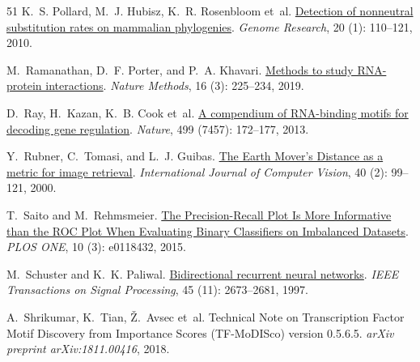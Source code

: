 \begin{thebibliography}{51}
K.~S. Pollard, M.~J. Hubisz, K.~R. Rosenbloom et~al.
\newblock \href{https://doi.org/10.1101/gr.097857.109}{Detection of nonneutral
  substitution rates on mammalian phylogenies}.
\newblock \emph{Genome Research}, 20 (1): 110--121, 2010.

M.~Ramanathan, D.~F. Porter, and P.~A. Khavari.
\newblock \href{https://doi.org/10.1038/s41592-019-0330-1}{Methods to study
  RNA-protein interactions}.
\newblock \emph{Nature Methods}, 16 (3): 225--234, 2019.

D.~Ray, H.~Kazan, K.~B. Cook et~al.
\newblock \href{https://doi.org/10.1038/nature12311}{A compendium of
  RNA-binding motifs for decoding gene regulation}.
\newblock \emph{Nature}, 499 (7457): 172--177, 2013.

Y.~Rubner, C.~Tomasi, and L.~J. Guibas.
\newblock \href{https://doi.org/10.1023/A:1026543900054}{The Earth Mover's
  Distance as a metric for image retrieval}.
\newblock \emph{International Journal of Computer Vision}, 40
  (2): 99--121, 2000.

T.~Saito and M.~Rehmsmeier.
\newblock \href{https://doi.org/10.1371/journal.pone.0118432}{The
  Precision-Recall Plot Is More Informative than the ROC Plot When Evaluating
  Binary Classifiers on Imbalanced Datasets}.
\newblock \emph{PLOS ONE}, 10 (3): e0118432, 2015.

M.~Schuster and K.~K. Paliwal.
\newblock \href{https://doi.org/10.1109/78.650093}{Bidirectional recurrent
  neural networks}.
\newblock \emph{IEEE Transactions on Signal Processing}, 45
  (11): 2673--2681, 1997.

A.~Shrikumar, K.~Tian, {\v Z}.~Avsec et~al.
\newblock Technical Note on Transcription Factor Motif Discovery from
  Importance Scores ({TF-MoDISco}) version 0.5.6.5.
\newblock \emph{arXiv preprint arXiv:1811.00416}, 2018.


\end{thebibliography}
